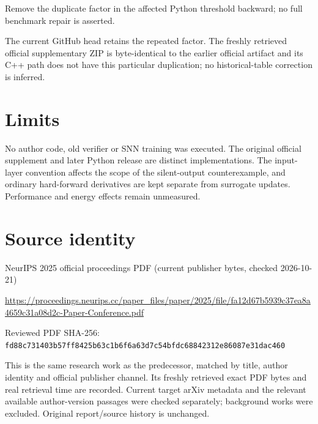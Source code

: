 \documentclass[11pt]{article}
\begin{document}
Remove the duplicate factor in the affected Python threshold backward; no full benchmark repair is asserted.

The current GitHub head retains the repeated factor. The freshly retrieved official supplementary ZIP is byte-identical to the earlier official artifact and its C++ path does not have this particular duplication; no historical-table correction is inferred.

\section*{Limits}

No author code, old verifier or SNN training was executed. The original official supplement and later Python release are distinct implementations. The input-layer convention affects the scope of the silent-output counterexample, and ordinary hard-forward derivatives are kept separate from surrogate updates. Performance and energy effects remain unmeasured.\par

\section*{Source identity}

NeurIPS 2025 official proceedings PDF (current publisher bytes, checked 2026-10-21)

\url{https://proceedings.neurips.cc/paper_files/paper/2025/file/fa12d67b5939c37ea8a4659c31a08d2c-Paper-Conference.pdf}

Reviewed PDF SHA-256: \nolinkurl{fd88c731403b57ff8425b63c1b6f6a63d7c54bfdc68842312e86087e31dac460}

This is the same research work as the predecessor, matched by title, author identity and official publisher channel. Its freshly retrieved exact PDF bytes and real retrieval time are recorded. Current target arXiv metadata and the relevant available author-version passages were checked separately; background works were excluded. Original report/source history is unchanged.
\end{document}
